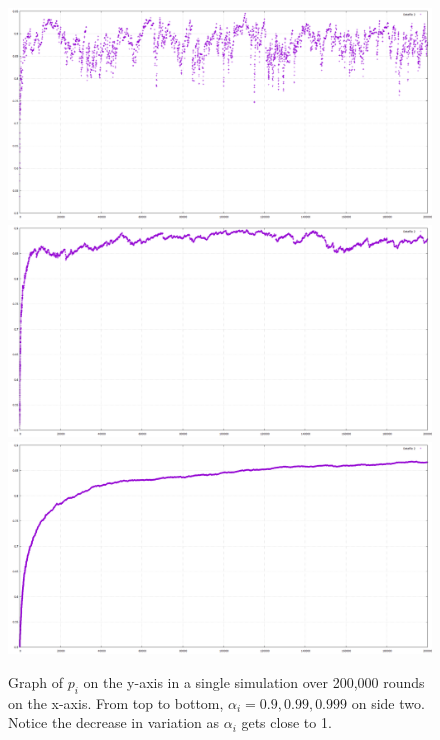 \documentclass{article}
\begin{document}
\begin{figure}[htp]
\centering
\includegraphics[width=.8\textwidth]{images/ai9side2x200000}\hfill
\includegraphics[width=.8\textwidth]{images/ai99side2x200000}\hfill
\includegraphics[width=.8\textwidth]{images/ai999side2x200000}
\caption{Graph of $p_i$ on the y-axis in a single simulation over 200,000 rounds on the x-axis. From top to bottom, $\alpha_i = 0.9, 0.99, 0.999$ on side two.  Notice the decrease in variation as $\alpha_i$ gets close to 1.}
\label{fig:figure3}
\end{figure}
\end{document}
